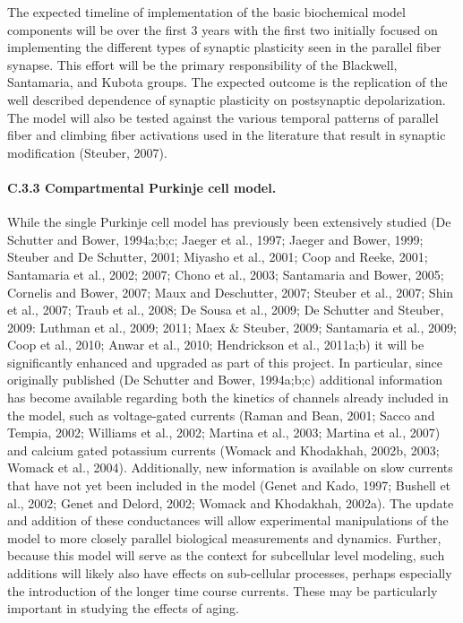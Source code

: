 \documentclass[12pt]{article}
\begin{document}
The expected timeline of implementation of the basic biochemical model components will be over the first 3 years with the first two initially focused on implementing the different types of synaptic plasticity seen in the parallel fiber synapse. This effort will be the primary responsibility of the Blackwell, Santamaria, and Kubota groups. The expected outcome is the replication of the well described dependence of synaptic plasticity on postsynaptic depolarization. The model will also be tested against the various temporal patterns of parallel fiber and climbing fiber activations used in the literature that result in synaptic modification (Steuber, 2007).

\paragraph{C.3.3 Compartmental Purkinje cell model.} While the single Purkinje cell model has previously been extensively studied (De Schutter and Bower, 1994a;b;c; Jaeger et al., 1997; Jaeger and Bower, 1999; Steuber and De Schutter, 2001; Miyasho et al., 2001; Coop and Reeke, 2001; Santamaria et al., 2002; 2007; Chono et al., 2003; Santamaria and Bower, 2005; Cornelis and Bower, 2007; Maux and Deschutter, 2007; Steuber et al., 2007; Shin et al., 2007; Traub et al., 2008; De Sousa et al., 2009; De Schutter and Steuber, 2009: Luthman et al., 2009; 2011; Maex \& Steuber, 2009; Santamaria et al., 2009; Coop et al., 2010; Anwar et al., 2010; Hendrickson et al., 2011a;b) it will be significantly enhanced and upgraded as part of this project. In particular, since originally published (De Schutter and Bower, 1994a;b;c) additional information has become available regarding both the kinetics of channels already included in the model, such as voltage-gated currents (Raman and Bean, 2001; Sacco and Tempia, 2002; Williams et al., 2002; Martina et al., 2003; Martina et al., 2007) and calcium gated potassium currents (Womack and Khodakhah, 2002b, 2003; Womack et al., 2004). Additionally, new information is available on slow currents that have not yet been included in the model (Genet and Kado, 1997; Bushell et al., 2002; Genet and Delord, 2002; Womack and Khodakhah, 2002a). The update and addition of these conductances will allow experimental manipulations of the model to more closely parallel biological measurements and dynamics. Further, because this model will serve as the context for subcellular level modeling, such additions will likely also have effects on sub-cellular processes, perhaps especially the introduction of the longer time course currents. These may be particularly important in studying the effects of aging.
\end{document}
